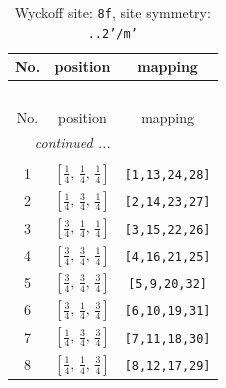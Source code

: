 \documentclass[fleqn,8pt]{jsarticle}
\begin{document}
\begin{longtable}{ccc}
\caption{Wyckoff site: {\tt 8f}, site symmetry: {\tt ..2'/m'}}
 \\
 \hline \hline
No. & position & mapping \\ \hline \endfirsthead

\multicolumn{2}{l}{\tablename\ \thetable{}} \\
 \hline \hline
No. & position & mapping \\ \hline \endhead

 \hline \hline
\multicolumn{2}{r}{\footnotesize\it continued ...} \\ \endfoot

 \hline \hline
\multicolumn{2}{r}{} \\ \endlastfoot

1 & $\left[ \frac{1}{4},\, \frac{1}{4},\, \frac{1}{4} \right]$ & {\tt [1,13,24,28]} \\ \hline
2 & $\left[ \frac{1}{4},\, \frac{3}{4},\, \frac{1}{4} \right]$ & {\tt [2,14,23,27]} \\ \hline
3 & $\left[ \frac{3}{4},\, \frac{1}{4},\, \frac{1}{4} \right]$ & {\tt [3,15,22,26]} \\ \hline
4 & $\left[ \frac{3}{4},\, \frac{3}{4},\, \frac{1}{4} \right]$ & {\tt [4,16,21,25]} \\ \hline
5 & $\left[ \frac{3}{4},\, \frac{3}{4},\, \frac{3}{4} \right]$ & {\tt [5,9,20,32]} \\ \hline
6 & $\left[ \frac{3}{4},\, \frac{1}{4},\, \frac{3}{4} \right]$ & {\tt [6,10,19,31]} \\ \hline
7 & $\left[ \frac{1}{4},\, \frac{3}{4},\, \frac{3}{4} \right]$ & {\tt [7,11,18,30]} \\ \hline
8 & $\left[ \frac{1}{4},\, \frac{1}{4},\, \frac{3}{4} \right]$ & {\tt [8,12,17,29]} \\
\end{longtable}
\renewcommand{\arraystretch}{1.2}
\end{document}
